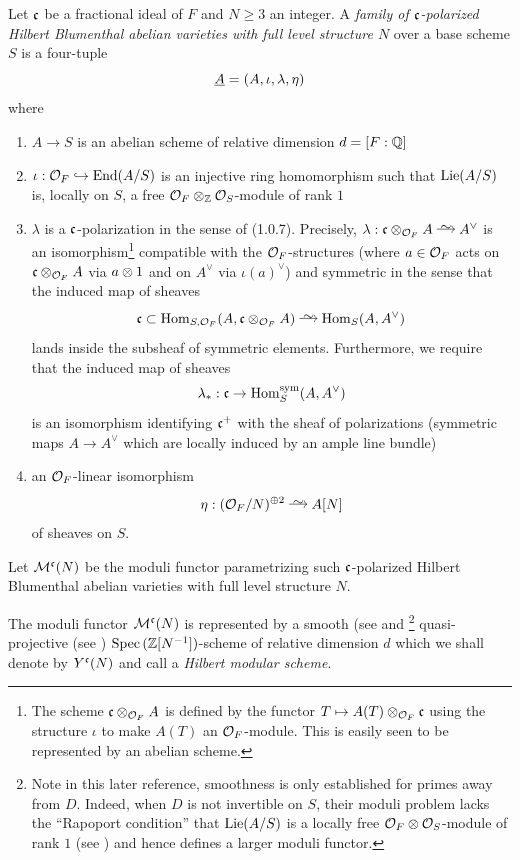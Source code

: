 \documentclass[main.tex]{subfiles}
\begin{document}
\begin{defn}
Let $\mathfrak{c}$ be a fractional ideal of $F$ and $N \ge 3$ an integer. A \textit{family of $\mathfrak{c}$-polarized Hilbert Blumenthal abelian varieties with full level structure $N$} over a base scheme $S$ is a four-tuple
\[ \underline{A} = (A, \iota, \lambda, \eta) \]
where
\begin{enumerate}
\item $A \to S$ is an abelian scheme of relative dimension $d = [F : \mathbb{Q}]$
\item $\iota : \mathcal{O}_F \hookrightarrow \operatorname{\mathrm{End}}(A/S)$ is an injective ring homomorphism such that $\mathrm{Lie}(A/S)$ is, locally on $S$, a free $\mathcal{O}_F \otimes_{\mathbb{Z}} \mathcal{O}_{S}$-module of rank $1$
\item $\lambda$ is a $\mathfrak{c}$-polarization in the sense of \cite{katz:p-adic} (1.0.7). Precisely, $\lambda : \cc \ot_{\cO_F} A \iso A^{\vee}$ is an isomorphism\footnote{The scheme $\mathfrak{c} \otimes_{\mathcal{O}_F} A$ is defined by the functor $T \mapsto A(T) \otimes_{\mathcal{O}_F} \mathfrak{c}$ using the structure $\iota$ to make $A(T)$ an $\mathcal{O}_F$-module. This is easily seen to be represented by an abelian scheme.} compatible with the $\mathcal{O}_F$-structures (where $a \in \mathcal{O}_F$ acts on $\mathfrak{c} \otimes_{\mathcal{O}_F} A$ via $a \otimes 1$ and on $A^{\vee}$ via $\iota(a)^{\vee}$) and symmetric in the sense that the induced map of \etale sheaves
\[ \cc \subset \Hom_{S,\cO_F}(A, \cc \ot_{\cO_F} A) \iso \Hom_S(A, A^{\vee}) \]
lands inside the subsheaf of symmetric elements. Furthermore, we require that the induced map of \etale sheaves
\[ \lambda_* : \mathfrak{c} \to \operatorname{\mathrm{Hom}}^{\text{sym}}_S(A, A^{\vee}) \]   
is an isomorphism identifying $\mathfrak{c}^+$ with the sheaf of polarizations (symmetric maps $A \to A^{\vee}$ which are locally induced by an ample line bundle)
\item an $\mathcal{O}_F$-linear isomorphism 
\[ \eta : (\cO_F / N)^{\oplus 2} \iso A[N] \]
of \etale sheaves on $S$. 
\end{enumerate}
Let $\mathcal{M}^{\mathfrak{c}}(N)$ be the moduli functor parametrizing such $\mathfrak{c}$-polarized Hilbert Blumenthal abelian varieties with full level structure $N$. 
\end{defn}

The moduli functor $\mathcal{M}^{\mathfrak{c}}(N)$ is represented by a smooth (see \cite[Theorem~1.20 and Theorem~1.22]{rapoport:compactifications} and \cite[Theorem~2.2]{deligne:pappas_singularities}\footnote{Note in this later reference, smoothness is only established for primes away from $D$. Indeed, when $D$ is not invertible on $S$, their moduli problem lacks the ``Rapoport condition'' that $\mathrm{Lie}(A/S)$ is a locally free $\mathcal{O}_F \otimes \mathcal{O}_S$-module of rank $1$ (see \cite[Corollary~2.9]{deligne:pappas_singularities}) and hence defines a larger moduli functor.} quasi-projective (see \cite[Theorem~1.4]{chai:compactifications}) $\operatorname{\mathrm{Spec}}{(\mathbb{Z}[N^{-1}])}$-scheme of relative dimension $d$ which we shall denote by $Y^{\mathfrak{c}}(N)$ and call a \textit{Hilbert modular scheme}.
\end{document}
